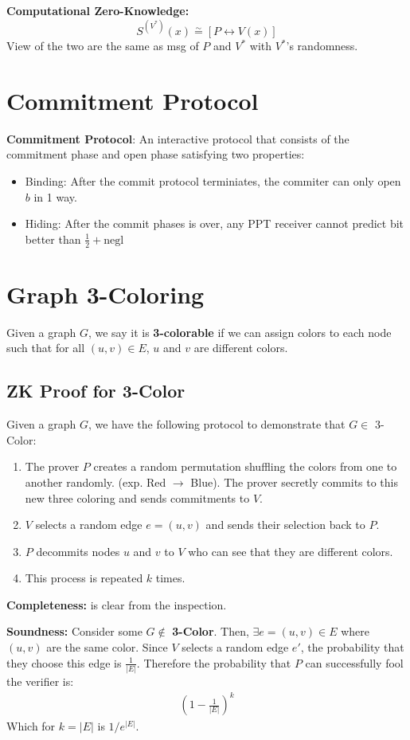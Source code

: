 \documentclass[11pt]{article}
\begin{document}
\textbf{Computational Zero-Knowledge:}
$$S^{(V^*)}(x) \overset{\sim}{=} [P \leftrightarrow V(x)]$$
View of the two are the same as msg of $P$ and $V^*$ with $V^*$'s randomness.

\section{Commitment Protocol}
\textbf{Commitment Protocol}: An interactive protocol that consists of the commitment phase and open phase satisfying two properties:
\begin{itemize}
    \item Binding: After the commit protocol terminiates, the commiter can only open $b$ in 1 way.
    \item Hiding: After the commit phases is over, any PPT receiver cannot predict bit better than $\frac{1}{2} + \text{negl}$
\end{itemize}

\section{Graph 3-Coloring}
Given a graph $G$, we say it is \textbf{3-colorable} if we can assign colors to each node such that for all $(u,v) \in E$, $u$ and $v$ are different colors.

\subsection{ZK Proof for 3-Color}
Given a graph $G$, we have the following protocol to demonstrate that $G \in $ 3-Color:
\begin{enumerate}
    \item The prover $P$ creates a random permutation shuffling the colors from one to another randomly. (exp. Red $\rightarrow$ Blue). The prover secretly commits to this new three coloring and sends commitments to $V$.
    \item $V$ selects a random edge $e = (u,v)$ and sends their selection back to $P$.
    \item $P$ decommits nodes $u$ and $v$ to $V$ who can see that they are different colors.
    \item This process is repeated $k$ times.
\end{enumerate}
\textbf{Completeness:} is clear from the inspection.

\textbf{Soundness:} Consider some $G \notin $ \textbf{3-Color}. Then, $\exists e = (u,v) \in E$ where $(u,v)$ are the same color. Since $V$ selects a random edge $e'$, the probability that they choose this edge is $\frac{1}{|E|}$. Therefore the probability that $P$ can successfully fool the verifier is:
\begin{align*}
    (1-\frac{1}{|E|})^k
\end{align*}
Which for $k = |E|$ is $1/e^{|E|}$.
\end{document}
